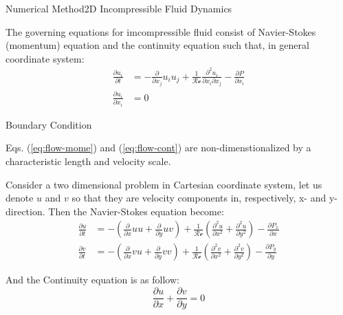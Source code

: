 \documentclass[\string~/GitHub/sthlmNordBeamerTheme/sthlmNordLightDemo.tex]{subfiles}
\begin{document}
\begin{frame}{Numerical Method}{2D Incompressible Fluid Dynamics}

	\prob The governing equations for imcompressible fluid consist of Navier-Stokes (momentum) equation and the continuity equation such that, in general coordinate system: \begin{align}
        \frac{\partial u_i}{\partial t} &= -\frac{\partial }{\partial x_j} u_i u_j + \frac{1}{\mathcal{Re}} \frac{\partial^2 u_i}{\partial x_i \partial x_j} - \frac{\partial P}{\partial x_i} \label{eq:flow-mome} \\
        \frac{\partial u_i}{\partial x_i} &= 0 \label{eq:flow-cont}
    \end{align}

    \begin{alertblock}{Boundary Condition}
        \begin{center}
            Eqs. (\ref{eq:flow-mome}) and (\ref{eq:flow-cont}) are non-dimenstionalized by a characteristic length and velocity scale.
        \end{center}
    \end{alertblock}

    \framebreak
            
    Consider a two dimensional problem in Cartesian coordinate system, let us denote $u$ and $v$ so that they are velocity components in, respectively, x- and y-direction. Then the Navier-Stokes equation become: \begin{align}
        \frac{\partial u}{\partial t} &= - \left( \frac{\partial }{\partial x} u u + \frac{\partial }{\partial y} u v \right) + \frac{1}{\mathcal{Re}} \left( \frac{\partial^2 u}{\partial x^2} + \frac{\partial^2 u}{\partial y^2} \right) - \frac{\partial P_x}{\partial x} \\
        \frac{\partial v}{\partial t} &= - \left( \frac{\partial }{\partial x} v u + \frac{\partial }{\partial y} v v \right) + \frac{1}{\mathcal{Re}} \left( \frac{\partial^2 v}{\partial x^2} + \frac{\partial^2 v}{\partial y^2} \right) - \frac{\partial P_y}{\partial y}
    \end{align}

    And the Continuity equation is as follow: \begin{equation}
        \frac{\partial u}{\partial x} + \frac{\partial v}{\partial y} = 0
    \end{equation}


\end{frame}
\end{document}
